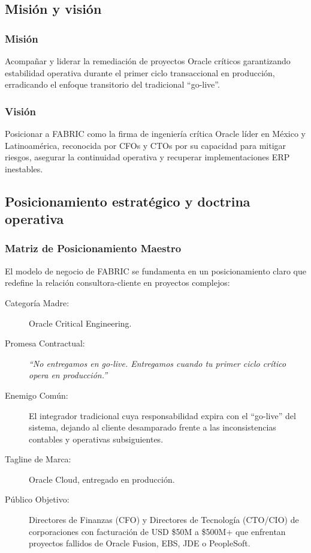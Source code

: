 \documentclass[11pt,letterpaper]{article}
\begin{document}
\subsection{Misión y visión}

\subsubsection{Misión}
Acompañar y liderar la remediación de proyectos Oracle críticos garantizando estabilidad operativa durante el primer ciclo transaccional en producción, erradicando el enfoque transitorio del tradicional ``go-live''.

\subsubsection{Visión}
Posicionar a FABRIC como la firma de ingeniería crítica Oracle líder en México y Latinoamérica, reconocida por CFOs y CTOs por su capacidad para mitigar riesgos, asegurar la continuidad operativa y recuperar implementaciones ERP inestables.

\subsection{Posicionamiento estratégico y doctrina operativa}

\subsubsection{Matriz de Posicionamiento Maestro}
El modelo de negocio de FABRIC se fundamenta en un posicionamiento claro que redefine la relación consultora-cliente en proyectos complejos:
\begin{description}
\item[Categoría Madre:] Oracle Critical Engineering.
\item[Promesa Contractual:] \emph{``No entregamos en go-live. Entregamos cuando tu primer ciclo crítico opera en producción.''}
\item[Enemigo Común:] El integrador tradicional cuya responsabilidad expira con el ``go-live'' del sistema, dejando al cliente desamparado frente a las inconsistencias contables y operativas subsiguientes.
\item[Tagline de Marca:] Oracle Cloud, entregado en producción.
\item[Público Objetivo:] Directores de Finanzas (CFO) y Directores de Tecnología (CTO/CIO) de corporaciones con facturación de USD \$50M a \$500M+ que enfrentan proyectos fallidos de Oracle Fusion, EBS, JDE o PeopleSoft.
\end{description}
\end{document}
